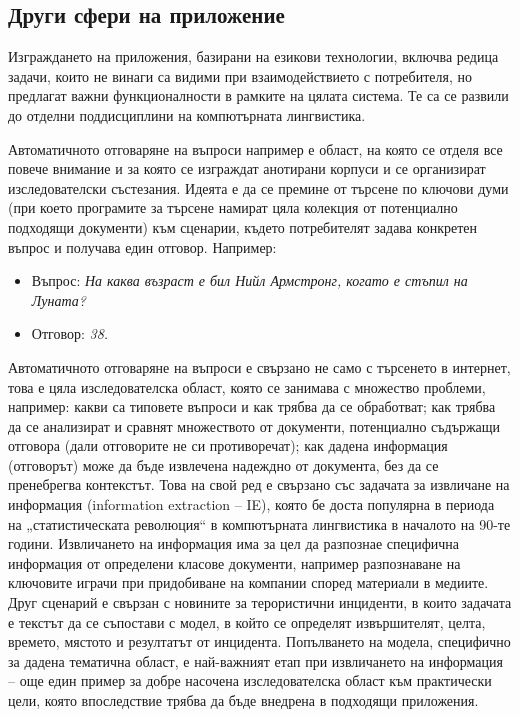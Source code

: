 \documentclass[]{../../metanetpaper}
\begin{document}
\begin{multicols}{2}
\subsection{Други сфери на приложение}

Изграждането на приложения, базирани на езикови технологии, включва редица задачи, които не винаги са видими при взаимодействието с потребителя,
 но предлагат важни функционалности в рамките на цялата система. Те са се развили до отделни поддисциплини на компютърната лингвистика.

Автоматичното отговаряне на въпроси например е област, на която се отделя все повече внимание и за която се изграждат анотирани корпуси и се организират изследователски състезания. Идеята е да се премине от търсене по ключови думи (при което програмите за търсене намират цяла колекция от потенциално
 подходящи документи) към сценарии, където потребителят задава конкретен въпрос и получава един отговор. Например: 

\begin{itemize}
\item[] Въпрос: \textit{На каква възраст е бил Нийл Армстронг, когато е стъпил на Луната?}
\item[] Отговор: \textit{38.}
\end{itemize}

Автоматичното отговаряне на въпроси е свързано не само с търсенето в интернет, това е цяла изследователска област, която се занимава с множество проблеми, например: какви са типовете въпроси и как трябва да се обработват; как трябва да се анализират и сравнят множеството от документи, потенциално
 съдържащи отговора (дали отговорите не си противоречат); как
дадена информация (отговорът) може да бъде извлечена  надеждно от документа, без да се пренебрегва контекстът.
Това на свой ред е свързано със задачата за извличане на информация (information extraction -- IE), която бе доста популярна в периода на „статистическата революция“ в компютърната лингвистика в началото на 90-те години. Извличането на информация има за цел да разпознае специфична информация от определени класове документи, например разпознаване на ключовите играчи при
 придобиване на компании според материали в медиите. Друг сценарий е свързан с новините за терористични инциденти, в които задачата е текстът да се съпостави  с модел, в който се определят извършителят, целта, времето, мястото и резултатът от инцидента. Попълването на модела, специфично за дадена тематична област, е най-важният етап при извличането на информация – още
 един пример за добре насочена изследователска област към практически цели, която впоследствие трябва да бъде внедрена в подходящи приложения.


\end{multicols}
\end{document}
